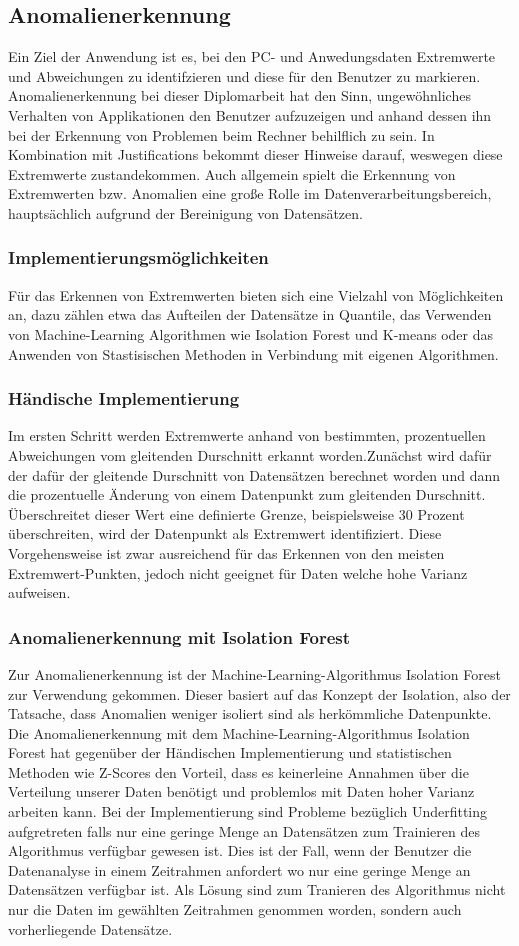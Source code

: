 \documentclass{report}
\begin{document}
\subsection{Anomalienerkennung}
Ein Ziel der Anwendung ist es, bei den PC- und Anwedungsdaten Extremwerte und Abweichungen zu identifzieren und diese für den Benutzer zu markieren. Anomalienerkennung bei dieser Diplomarbeit hat den Sinn, ungewöhnliches Verhalten von Applikationen den Benutzer aufzuzeigen und anhand dessen ihn bei der Erkennung von Problemen beim Rechner behilflich zu sein. In Kombination mit Justifications bekommt dieser Hinweise darauf, weswegen diese Extremwerte zustandekommen. Auch allgemein spielt die Erkennung von Extremwerten bzw. Anomalien eine große Rolle im Datenverarbeitungsbereich, hauptsächlich aufgrund der Bereinigung von Datensätzen.
\subsubsection{Implementierungsmöglichkeiten}
Für das Erkennen von Extremwerten bieten sich eine Vielzahl von Möglichkeiten an, dazu zählen etwa das Aufteilen der Datensätze in Quantile, das Verwenden von Machine-Learning Algorithmen wie Isolation Forest und K-means oder das Anwenden von Stastisischen Methoden in Verbindung mit eigenen Algorithmen. 
\subsubsection{Händische Implementierung}
Im ersten Schritt werden Extremwerte anhand von bestimmten, prozentuellen Abweichungen vom gleitenden Durschnitt erkannt worden.Zunächst wird dafür der dafür der gleitende Durschnitt von Datensätzen berechnet worden und dann die prozentuelle Änderung von einem Datenpunkt zum gleitenden Durschnitt. Überschreitet dieser Wert eine definierte Grenze, beispielsweise 30 Prozent überschreiten, wird der Datenpunkt als Extremwert identifiziert.
Diese Vorgehensweise ist zwar ausreichend für das Erkennen von den meisten Extremwert-Punkten, jedoch nicht geeignet für Daten welche hohe Varianz aufweisen. 
\subsubsection{Anomalienerkennung mit Isolation Forest}
Zur Anomalienerkennung ist der Machine-Learning-Algorithmus Isolation Forest zur Verwendung gekommen. Dieser basiert auf das Konzept der Isolation, also der Tatsache, dass Anomalien weniger isoliert sind als herkömmliche Datenpunkte. 
Die Anomalienerkennung mit dem Machine-Learning-Algorithmus Isolation Forest hat gegenüber der Händischen Implementierung und statistischen Methoden wie Z-Scores den Vorteil, dass es keinerleine Annahmen über die Verteilung unserer Daten benötigt und problemlos mit Daten hoher Varianz arbeiten kann.
Bei der Implementierung sind Probleme bezüglich Underfitting aufgretreten falls nur eine geringe Menge an Datensätzen zum Trainieren des Algorithmus verfügbar gewesen ist. Dies ist der Fall, wenn der Benutzer die Datenanalyse in einem Zeitrahmen anfordert wo nur eine geringe Menge an Datensätzen verfügbar ist. Als Lösung sind zum Tranieren des Algorithmus nicht nur die Daten im gewählten Zeitrahmen genommen worden, sondern auch vorherliegende Datensätze. 
\end{document}
